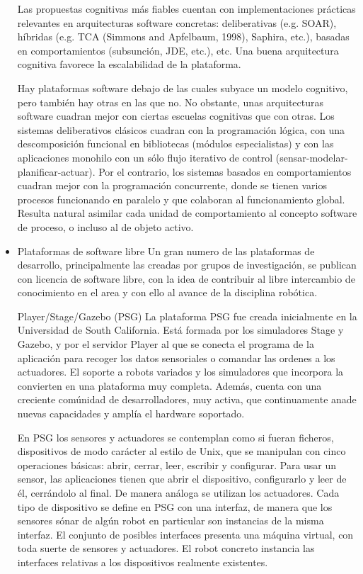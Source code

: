 \begin{itemize}
	Las propuestas cognitivas más fiables cuentan con implementaciones prácticas relevantes en arquitecturas software concretas: deliberativas (e.g. SOAR), híbridas (e.g. TCA (Simmons and Apfelbaum, 1998), Saphira, etc.), basadas en comportamientos (subsunción, JDE, etc.), etc. Una buena arquitectura cognitiva favorece la escalabilidad de la plataforma.

	Hay plataformas software debajo de las cuales subyace un modelo cognitivo, pero también hay otras en las que no. No obstante, unas arquitecturas software cuadran mejor con ciertas escuelas cognitivas que con otras. Los sistemas deliberativos clásicos cuadran con la programación lógica, con una descomposición funcional en bibliotecas (módulos especialistas) y con las aplicaciones monohilo con un sólo flujo iterativo de control (sensar-modelar-planificar-actuar). Por el contrario, los sistemas basados en comportamientos cuadran mejor con la programación concurrente, donde se tienen varios procesos funcionando en paralelo y que colaboran al funcionamiento global. Resulta natural asimilar cada unidad de comportamiento al concepto software de proceso, o incluso al de objeto activo.

	\item Plataformas de software libre
	Un gran numero de las plataformas de desarrollo, principalmente las creadas por grupos de investigación, se publican con licencia de software libre, con la idea de contribuir al libre intercambio de conocimiento en el area y con ello al avance de la disciplina robótica.

	Player/Stage/Gazebo (PSG) La plataforma PSG fue creada inicialmente en la Universidad de South California. Está formada por los simuladores Stage y Gazebo, y por el servidor Player al que se conecta el programa de la aplicación para recoger los datos sensoriales o comandar las ordenes a los actuadores. El soporte a robots variados y los simuladores que incorpora la convierten en una plataforma muy completa. Además, cuenta con una creciente comúnidad de desarrolladores, muy activa, que continuamente anade nuevas capacidades y amplía el hardware soportado.

	En PSG los sensores y actuadores se contemplan como si fueran ficheros, dispositivos de modo carácter al estilo de Unix, que se manipulan con cinco operaciones básicas: abrir, cerrar, leer, escribir y configurar. Para usar un sensor, las aplicaciones tienen que abrir el dispositivo, configurarlo y leer de él, cerrándolo al final. De manera análoga se utilizan los actuadores. Cada tipo de dispositivo se define en PSG con una interfaz, de manera que los sensores sónar de algún robot en particular son instancias de la misma interfaz. El conjunto de posibles interfaces presenta una máquina virtual, con toda suerte de sensores y actuadores. El robot concreto instancia las interfaces relativas a los dispositivos realmente existentes.


\end{itemize}
